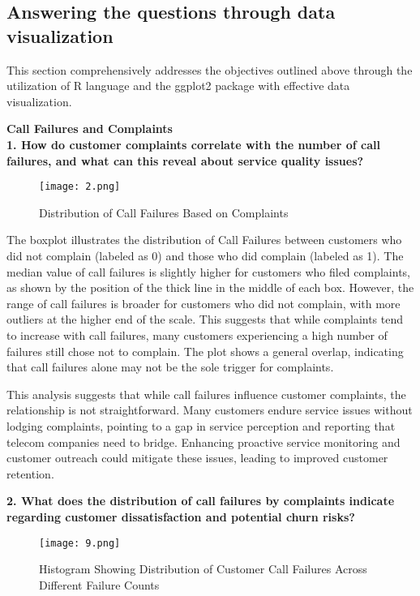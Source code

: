 \documentclass[12pt]{article}
\begin{document}
\subsection{Answering the questions through data visualization}
This section comprehensively addresses the objectives outlined above through the utilization of R language and the ggplot2 package with effective data visualization.

\vspace{0.5cm}

\textbf{Call Failures and Complaints} \\

\textbf{1. How do customer complaints correlate with the number of call failures, and what can this reveal about service quality issues?}

\begin{figure}[h]
    \centering
    \texttt{[image: 2.png]}  
    \caption{Distribution of Call Failures Based on Complaints}
\end{figure}
The boxplot illustrates the distribution of Call Failures between customers who did not complain (labeled as 0) and those who did complain (labeled as 1). The median value of call failures is slightly higher for customers who filed complaints, as shown by the position of the thick line in the middle of each box. However, the range of call failures is broader for customers who did not complain, with more outliers at the higher end of the scale. This suggests that while complaints tend to increase with call failures, many customers experiencing a high number of failures still chose not to complain. The plot shows a general overlap, indicating that call failures alone may not be the sole trigger for complaints.

This analysis suggests that while call failures influence customer complaints, the relationship is not straightforward. Many customers endure service issues without lodging complaints, pointing to a gap in service perception and reporting that telecom companies need to bridge. Enhancing proactive service monitoring and customer outreach could mitigate these issues, leading to improved customer retention.
\vspace{0.5cm}

\textbf{2. What does the distribution of call failures by complaints indicate regarding customer dissatisfaction and potential churn risks?}
\begin{figure}[h]
    \centering
    \texttt{[image: 9.png]}  
    \caption{Histogram Showing Distribution of Customer Call Failures Across Different Failure Counts}
\end{figure}
\FloatBarrier
\end{document}
